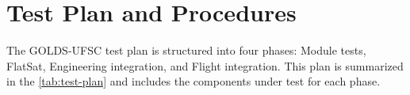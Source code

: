 %
%
%
%
%

%
%
%
%
%
%

\chapter{Test Plan and Procedures} \label{ch:test-plan}

The GOLDS-UFSC test plan is structured into four phases: Module tests, FlatSat, Engineering integration, and Flight integration. This plan is summarized in the \autoref{tab:test-plan} and includes the components under test for each phase. 

